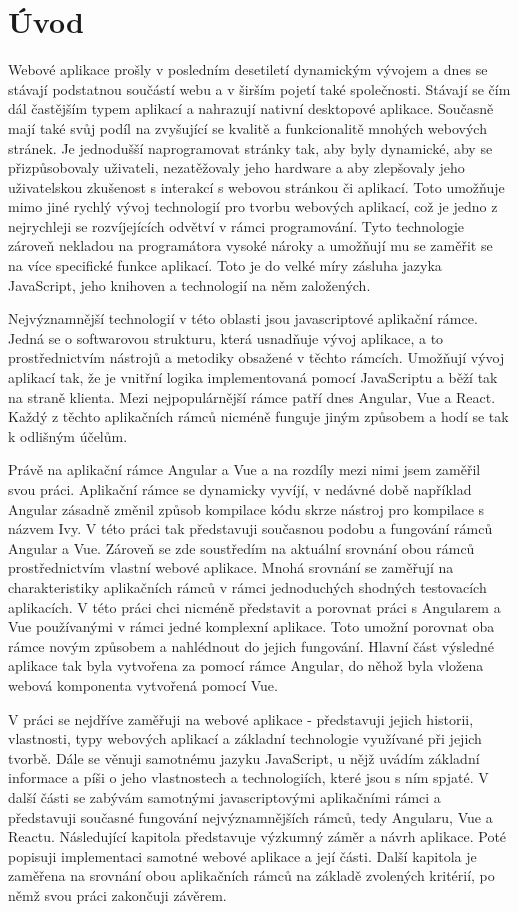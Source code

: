 
\chapter{Úvod}
Webové aplikace prošly v posledním desetiletí dynamickým vývojem a dnes se stávají podstatnou součástí webu a v širším pojetí také společnosti. Stávají se čím dál častějším typem aplikací a nahrazují nativní desktopové aplikace. Současně mají také svůj podíl na zvyšující se kvalitě a funkcionalitě mnohých webových stránek. Je jednodušší naprogramovat stránky tak, aby byly dynamické, aby se přizpůsobovaly uživateli, nezatěžovaly jeho hardware a aby zlepšovaly jeho uživatelskou zkušenost s interakcí s webovou stránkou či aplikací. Toto umožňuje mimo jiné rychlý vývoj technologií pro tvorbu webových aplikací, což je jedno z nejrychleji se rozvíjejících odvětví v rámci programování. Tyto technologie zároveň nekladou na programátora vysoké nároky a umožňují mu se zaměřit se na více specifické funkce aplikací. Toto je do velké míry zásluha jazyka JavaScript, jeho knihoven a technologií na něm založených.

Nejvýznamnější technologií v této oblasti jsou javascriptové aplikační rámce. Jedná se o softwarovou strukturu, která usnadňuje vývoj aplikace, a to prostřednictvím nástrojů a metodiky obsažené v těchto rámcích. Umožňují vývoj aplikací tak, že je vnitřní logika implementovaná pomocí JavaScriptu a běží tak na straně klienta. Mezi nejpopulárnější rámce patří dnes Angular, Vue a React. Každý z těchto aplikačních rámců nicméně funguje jiným způsobem a hodí se tak k odlišným účelům.

Právě na aplikační rámce Angular a Vue a na rozdíly mezi nimi jsem zaměřil svou práci. Aplikační rámce se dynamicky vyvíjí, v nedávné době například Angular zásadně změnil způsob kompilace kódu skrze nástroj pro kompilace s názvem Ivy. V této práci tak představuji současnou podobu a fungování rámců Angular a Vue. Zároveň se zde soustředím na aktuální srovnání obou rámců prostřednictvím vlastní webové aplikace. Mnohá srovnání se zaměřují na charakteristiky aplikačních rámců v rámci jednoduchých shodných testovacích aplikacích. V této práci chci nicméně představit a porovnat práci s Angularem a Vue používanými v rámci jedné komplexní aplikace. Toto umožní porovnat oba rámce novým způsobem a nahlédnout do jejich fungování. Hlavní část výsledné aplikace tak byla vytvořena za pomocí rámce Angular, do něhož byla vložena webová komponenta vytvořená pomocí Vue.

V práci se nejdříve zaměřuji na webové aplikace - představuji jejich historii, vlastnosti, typy webových aplikací a základní technologie využívané při jejich tvorbě. Dále se věnuji samotnému jazyku JavaScript, u nějž uvádím základní informace a píši o jeho vlastnostech a technologiích, které jsou s ním spjaté. V další části se zabývám samotnými javascriptovými aplikačními rámci a představuji současné fungování nejvýznamnějších rámců, tedy Angularu, Vue a Reactu. Následující kapitola představuje výzkumný záměr a návrh aplikace. Poté popisuji implementaci samotné webové aplikace a její části. Další kapitola je zaměřena na srovnání obou aplikačních rámců na základě zvolených kritérií, po němž svou práci zakončuji závěrem. 